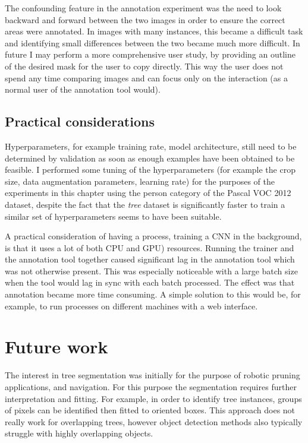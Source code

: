 The confounding feature in the annotation experiment was the need to look backward and forward between the two images in order to ensure the correct areas were annotated. In images with many instances, this became a difficult task and identifying small differences between the two became much more difficult. In future I may perform a more comprehensive user study, by providing an outline of the desired mask for the user to copy directly. This way the user does not spend any time comparing images and can focus only on the interaction (as a normal user of the annotation tool would).


\subsection{Practical considerations}

Hyperparameters, for example training rate, model architecture, still need to be determined by validation as soon as enough examples have been obtained to be feasible. I performed some tuning of the hyperparameters (for example the crop size, data augmentation parameters, learning rate) for the purposes of the experiments in this chapter using the person category of the Pascal \gls{VOC} 2012 dataset, despite the fact that the \emph{tree} dataset is significantly faster to train a similar set of hyperparameters seems to have been suitable.


A practical consideration of having a process, training a \gls{CNN} in the background, is that it uses a lot of both \gls{CPU} and \gls{GPU}) resources. Running the trainer and the annotation tool together caused significant lag in the annotation tool which was not otherwise present. This was especially noticeable with a large batch size when the tool would lag in sync with each batch processed. The effect was that annotation became more time consuming. A simple solution to this would be, for example, to run processes on different machines with a web interface.


\section{Future work}

The interest in tree segmentation was initially for the purpose of robotic pruning applications, and navigation. For this purpose the segmentation requires further interpretation and fitting. For example, in order to identify tree instances, groups of pixels can be identified then fitted to oriented boxes. This approach does not really work for overlapping trees, however object detection methods also typically struggle with highly overlapping objects.

